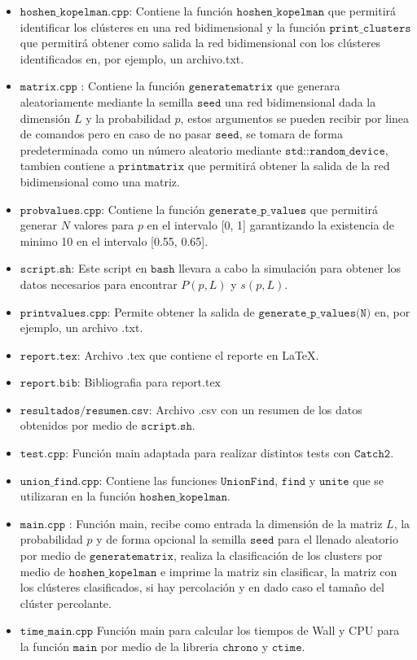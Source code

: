 \documentclass[12pt,a4paper]{article}
\begin{document}
\begin{itemize}
    \item $\texttt{hoshen\_kopelman.cpp}$: Contiene la función $\texttt{hoshen\_kopelman}$ que permitirá identificar los clústeres en una red bidimensional y la función $\texttt{print\_clusters}$ que permitirá obtener como salida la red bidimensional con los clústeres identificados en, por ejemplo, un archivo.txt.
    \item $\texttt{matrix.cpp }$: Contiene la función $\texttt{generatematrix}$ que generara aleatoriamente mediante la semilla $\texttt{seed}$ una red bidimensional dada la dimensión $L$ y la probabilidad $p$, estos argumentos se pueden recibir por linea de comandos pero en caso de no pasar $\texttt{seed}$, se tomara de forma predeterminada como un número aleatorio mediante $\texttt{std::random\_device}$, tambien contiene a $\texttt{printmatrix}$ que permitirá obtener la salida de la red bidimensional como una matriz. 
    \item $\texttt{probvalues.cpp}$: Contiene la función $\texttt{generate\_p\_values}$ que permitirá generar $N$ valores para $p$ en el intervalo [0, 1] garantizando la existencia de minimo 10 en el intervalo [0.55, 0.65].
    \item $\texttt{script.sh}$: Este script en $\texttt{bash}$ llevara a cabo la simulación para obtener los datos necesarios para encontrar $P(p,L)$ y $s(p,L)$.
    \item $\texttt{printvalues.cpp}$: Permite obtener la salida de $\texttt{generate\_p\_values(N)}$ en, por ejemplo, un archivo .txt.
    \item $\texttt{report.tex}$: Archivo .tex que contiene el reporte en \LaTeX.
    \item $\texttt{report.bib}$: Bibliografia para $\text{report.tex}$
    \item $\texttt{resultados/resumen.csv}$: Archivo .csv con un resumen de los datos obtenidos por medio de $\texttt{script.sh}$.
    \item $\texttt{test.cpp}$: Función main adaptada para realizar distintos tests con $\texttt{Catch2}$.
    \item $\texttt{union\_find.cpp}$: Contiene las funciones $\texttt{UnionFind}$, $\texttt{find}$ y $\texttt{unite}$ que se utilizaran en la función $\texttt{hoshen\_kopelman}$.
    \item $\texttt{main.cpp }$: Función main, recibe como entrada la dimensión de la matriz $L$, la probabilidad $p$ y de forma opcional la semilla $\texttt{seed}$ para el llenado aleatorio por medio de $\texttt{generatematrix}$, realiza la clasificación de los clusters por medio de $\texttt{hoshen\_kopelman}$ e imprime la matriz sin clasificar, la matriz con los clústeres clasificados, si hay percolación y en dado caso el tamaño del clúster percolante.
    \item $\texttt{time\_main.cpp}$ Función main para calcular los tiempos de Wall y CPU para la función $\texttt{main}$ por medio de la libreria $\texttt{chrono}$ y $\texttt{ctime}$.
\end{itemize}
\end{document}
